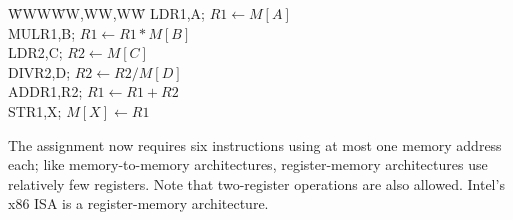 \vfill
\pagebreak

\vspace{-6pt}\begin{tabbing}
\hspace{.5in}\=WWW\=WW,WW,WW\=\kill
\>LD\>R1,A\>; $R1 \leftarrow M[A]$\\
\>MUL\>R1,B\>; $R1 \leftarrow R1 * M[B]$\\
\>LD\>R2,C\>; $R2 \leftarrow M[C]$\\
\>DIV\>R2,D\>; $R2 \leftarrow R2 / M[D]$\\
\>ADD\>R1,R2\>; $R1 \leftarrow R1 + R2$\\
\>ST\>R1,X\>; $M[X] \leftarrow R1$
\end{tabbing}\vspace{-6pt}
%
The assignment now requires six instructions using at most one memory
address each; like memory-to-memory architectures, register-memory
architectures use relatively few registers.  Note that two-register
operations are also allowed.  Intel's x86 ISA is a register-memory
architecture.

